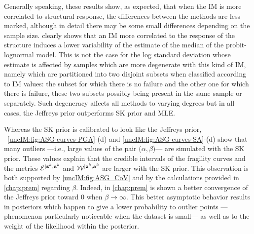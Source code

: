    Generally speaking, these results show, as expected, that when the IM is more correlated to structural response, the differences between the methods are less marked, although in detail there may be some small differences depending on the sample size. { clearly shows that an IM more correlated to the response of the structure induces a lower variability of the estimate of the median of the probit-lognormal model. This is not the case for the log standard deviation whose estimate is affected by samples which are more degenerate with this kind of IM, namely which are partitioned into two disjoint subsets when classified according to IM values: the subset for which there is no failure and the other one for which there is failure, these two subsets possibly being present in the same sample or separately. Such degeneracy affects all methods to varying degrees but in all cases, the Jeffreys prior outperforms SK prior and MLE.}
   
  Whereas the SK prior is calibrated to look like the Jeffreys prior, ~\ref{uncIM:fig:ASG-curves-PGA}-(d) and \ref{uncIM:fig:ASG-curves-SA}-(d) show that many outliers ---i.e., large values of the pair ($\alpha,\beta$)--- are simulated with the SK prior. These values explain that the credible intervals of the fragility curves and the metrics $\mathcal{E}^{|\mathbf{z}^{k},\mathbf{a}^{k}}$ and $\mathcal{W}^{|\mathbf{z}^{k},\mathbf{a}^{k}}$ are larger with the SK prior. This observation is both supported by \cref{uncIM:fig:ASG_CoV} and by the calculations provided in \cref{chap:prem} regarding $\beta$. Indeed, in \cref{chap:prem} is shown a better convergence of the Jeffreys prior toward $0$ when $\beta\to\infty$. This better  asymptotic behavior results in posteriors which happen to give a lower probability to outlier points  ---phenomenon particularly noticeable when the dataset is small--- as well as to the weight of the likelihood within the posterior.
  
